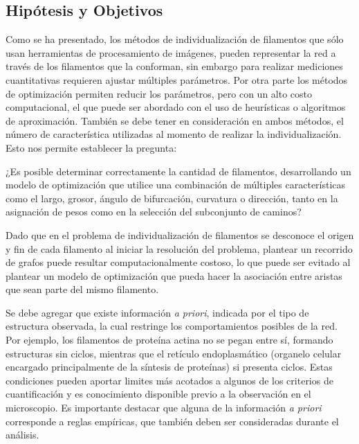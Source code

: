 \begin{intro}
\section*{Hip\'otesis y Objetivos}
Como se ha presentado, los m\'etodos de individualizaci\'on de filamentos que s\'olo usan herramientas de procesamiento de im\'agenes, pueden representar la red a trav\'es de los filamentos que la conforman, sin embargo para realizar mediciones cuantitativas requieren ajustar m\'ultiples par\'ametros. Por otra parte los m\'etodos de optimizaci\'on permiten reducir los par\'ametros, pero con un alto costo computacional, el que puede ser abordado con el uso de heur\'isticas o algoritmos de aproximaci\'on. Tambi\'en se debe tener en consideraci\'on en ambos m\'etodos, el n\'umero de caracter\'istica utilizadas al momento de realizar la individualizaci\'on. Esto nos permite establecer la pregunta:

\smallskip
¿Es posible determinar correctamente la cantidad de filamentos, desarrollando un modelo de optimizaci\'on que utilice una combinaci\'on de m\'ultiples caracter\'isticas como el largo, grosor, \'angulo de bifurcaci\'on, curvatura o direcci\'on, tanto en la asignaci\'on de pesos como en la selecci\'on del subconjunto de caminos?
\smallskip


Dado que en el problema de individualizaci\'on de filamentos se desconoce el origen y fin de cada filamento al iniciar la resoluci\'on del problema, plantear un recorrido de grafos puede resultar computacionalmente costoso, lo que puede ser evitado al plantear un modelo de optimizaci\'on que pueda hacer la asociaci\'on entre aristas que sean parte del mismo filamento.

Se debe agregar que existe informaci\'on \textit{a priori}, indicada por el tipo de estructura observada, la cual restringe los comportamientos posibles de la red. Por ejemplo, los filamentos de prote\'ina actina no se pegan entre s\'i, formando estructuras sin ciclos, mientras que el ret\'iculo endoplasm\'atico (organelo celular encargado principalmente de la s\'intesis de prote\'inas) si presenta ciclos. Estas condiciones pueden aportar limites m\'as acotados a algunos de los criterios de cuantificaci\'on y es conocimiento disponible previo a la observaci\'on en el microscopio. Es importante destacar que alguna de la informaci\'on {\it a priori} corresponde a reglas emp\'iricas, que tambi\'en deben ser consideradas durante el an\'alisis.


\end{intro}
